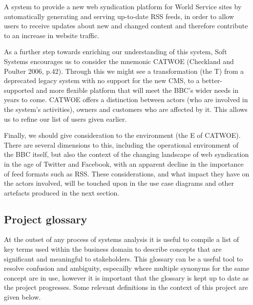 \documentclass[a4paper]{article}
\begin{document}
\begin{displayquote}
A system to provide a new web syndication platform for World Service sites by automatically generating and serving up-to-date RSS feeds, in order to allow users to receive updates about new and changed content and therefore contribute to an increase in website traffic.
\end{displayquote}

As a further step towards enriching our understanding of this system, Soft Systems encourages us to consider the mnemonic CATWOE (Checkland and Poulter 2006, p.42). Through this we might see a transformation (the T) from a deprecated legacy system with no support for the new CMS, to a better-supported and more flexible platform that will meet the BBC's wider needs in years to come. CATWOE offers a distinction between actors (who are involved in the system's activities), owners and customers who are affected by it. This allows us to refine our list of users given earlier.

Finally, we should give consideration to the environment (the E of CATWOE). There are several dimensions to this, including the operational environment of the BBC itself, but also the context of the changing landscape of web syndication in the age of Twitter and Facebook, with an apparent decline in the importance of feed formats such as RSS. These considerations, and what impact they have on the actors involved, will be touched upon in the use case diagrams and other artefacts produced in the next section.

\subsection{Project glossary}

At the outset of any process of systems analysis it is useful to compile a list of key terms used within the business domain to describe concepts that are significant and meaningful to stakeholders. This glossary can be a useful tool to resolve confusion and ambiguity, especailly where multiple synonyms for the same concept are in use, however it is important that the glossary is kept up to date as the project progresses. Some relevant definitions in the context of this project are given below.
\end{document}
